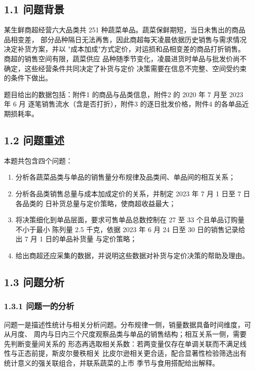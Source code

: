 
\subsection{1.1 问题背景}

某生鲜商超经营六大品类共 251 种蔬菜单品。蔬菜保鲜期短，当日未售出的商品品相变差，
部分品种隔日无法再售，因此商超每天凌晨依据历史销售与需求情况决定补货方案，并以
"成本加成"方式定价，对运损和品相变差的商品打折销售。商超的销售空间有限，蔬菜供应
品种随季节变化，凌晨进货时单品与批发价尚不确定，这些经营条件共同决定了补货与定价
决策需要在信息不完整、空间受约束的条件下做出。

题目给出的数据包括：附件1 的商品与品类信息，附件2 的 2020 年 7 月至 2023 年 6 月
逐笔销售流水（含是否打折），附件3 的逐日批发价格，附件4 的各单品近期损耗率。

\subsection{1.2 问题重述}

本题共包含四个问题：

\begin{enumerate}[label=（\arabic*）]
\item 分析各蔬菜品类与单品的销售量分布规律及品类间、单品间的相互关系；
\item 分析各品类销售总量与成本加成定价的关系，并制定 2023 年 7 月 1 日至 7 日各品类的
日补货总量与定价策略，使商超收益最大；
\item 将决策细化到单品层面，要求可售单品总数控制在 27 至 33 个且单品订购量不小于最小
陈列量 2.5 千克，依据 2023 年 6 月 24 日至 30 日的销售记录给出 7 月 1 日的单品补货量
与定价策略；
\item 给出商超还应采集的数据，并说明这些数据对补货与定价决策的帮助及理由。
\end{enumerate}

\subsection{1.3 问题分析}

\subsubsection{1.3.1 问题一的分析}

问题一是描述性统计与相关分析问题。分布规律一侧，销量数据具备时间维度，可从月度、
周内与日内三个尺度观察品类与单品的销售结构；相互关系一侧，需要先判断变量间关系的
形态再选取相关系数：若两变量仅存在单调关联而不满足线性与正态前提，斯皮尔曼秩相关
比皮尔逊相关更合适，配合显著性检验筛选出有统计意义的强关联组合，并联系蔬菜的上市
季节与食用搭配给出解释。

